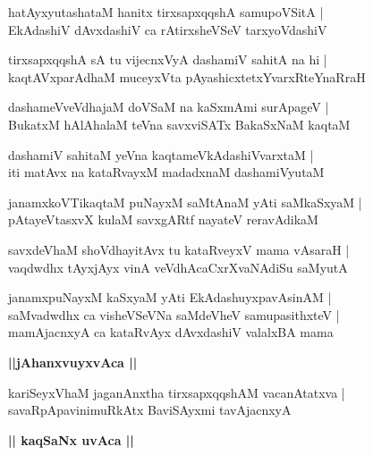 \documentclass[twoside,12pt,openright]{book}
\newcounter{shloka}[chapter]
\def\uvaca#1{\centerline{{\large\textbf{#1}}}}
\begin{document}
\begin{shloka}%
hatAyxyutashataM hanitx tirxsapxqqshA samupoVSitA |\\
EkAdashiV dAvxdashiV ca rAtirxsheVSeV tarxyoVdashiV
\end{shloka}

\begin{shloka}%
tirxsapxqqshA sA tu vijecnxVyA dashamiV sahitA na hi |\\
kaqtAVxparAdhaM muceyxVta pAyashicxtetxYvarxRteYnaRraH
\end{shloka}

\begin{shloka}%
dashameVveVdhajaM doVSaM na kaSxmAmi surApageV |\\
BukatxM hAlAhalaM teVna savxviSATx BakaSxNaM kaqtaM 
\end{shloka}

\begin{shloka}%
dashamiV sahitaM yeVna kaqtameVkAdashiVvarxtaM |\\
iti matAvx na kataRvayxM madadxnaM dashamiVyutaM
\end{shloka}

\begin{shloka}%
janamxkoVTikaqtaM puNayxM saMtAnaM yAti saMkaSxyaM |\\
pAtayeVtasxvX kulaM savxgARtf nayateV reravAdikaM 
\end{shloka}

\begin{shloka}%
savxdeVhaM shoVdhayitAvx tu kataRveyxV mama vAsaraH |\\
vaqdwdhx tAyxjAyx vinA veVdhAcaCxrXvaNAdiSu saMyutA
\end{shloka}

\begin{shloka}%
janamxpuNayxM kaSxyaM yAti EkAdashuyxpavAsinAM |\\
saMvadwdhx ca visheVSeVNa saMdeVheV samupasithxteV |\\
mamAjacnxyA ca kataRvAyx dAvxdashiV valalxBA mama
\end{shloka}

\uvaca{||jAhanxvuyxvAca ||}

\begin{shloka}%
kariSeyxVhaM jaganAnxtha tirxsapxqqshAM vacanAtatxva |\\
savaRpApavinimuRkAtx BaviSAyxmi tavAjacnxyA
\end{shloka}

\uvaca{|| kaqSaNx uvAca ||}
\end{document}
